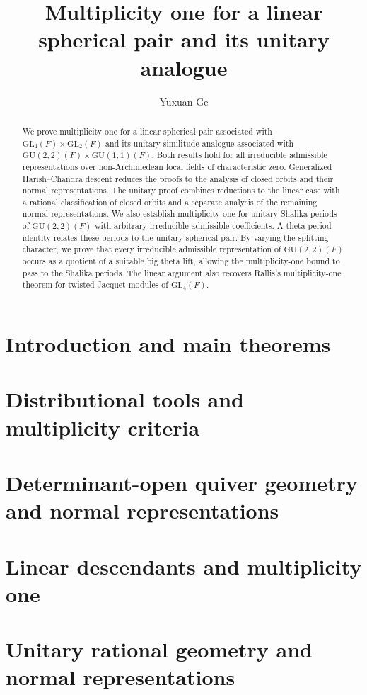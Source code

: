 \documentclass[11pt,reqno]{amsart}
\title[Multiplicity one for a linear spherical pair and its unitary analogue]{Multiplicity one for a linear spherical pair and its unitary analogue}
\author{Yuxuan Ge}
\date{}
\begin{document}
\begin{abstract}
We prove multiplicity one for a linear spherical pair associated with \(\mathrm{GL}_4(F)\times\mathrm{GL}_2(F)\) and its unitary similitude analogue associated with \(\mathrm{GU}(2,2)(F)\times\mathrm{GU}(1,1)(F)\). Both results hold for all irreducible admissible representations over non-Archimedean local fields of characteristic zero. Generalized Harish–Chandra descent reduces the proofs to the analysis of closed orbits and their normal representations. The unitary proof combines reductions to the linear case with a rational classification of closed orbits and a separate analysis of the remaining normal representations.
We also establish multiplicity one for unitary Shalika periods of \(\mathrm{GU}(2,2)(F)\) with arbitrary irreducible admissible coefficients. A theta-period identity relates these periods to the unitary spherical pair. By varying the splitting character, we prove that every irreducible admissible representation of \(\mathrm{GU}(2,2)(F)\) occurs as a quotient of a suitable big theta lift, allowing the multiplicity-one bound to pass to the Shalika periods. The linear argument also recovers Rallis's multiplicity-one theorem for twisted Jacquet modules of \(\mathrm{GL}_4(F)\).
\end{abstract}
\maketitle
\setcounter{tocdepth}{2}
\tableofcontents
\section{Introduction and main theorems}\label{sec:intro}

\section{Distributional tools and multiplicity criteria}\label{sec:tools}

\section{Determinant-open quiver geometry and normal representations}\label{sec:quiver}

\section{Linear descendants and multiplicity one}\label{sec:linear}

\section{Unitary rational geometry and normal representations}\label{sec:unitary-geometry}

\end{document}
